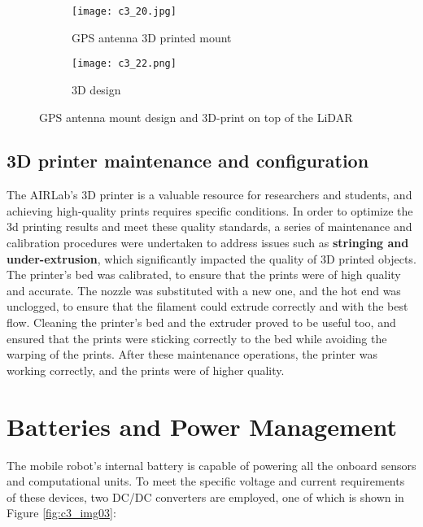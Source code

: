 \begin{figure}[t]
    \centering
    \begin{subfigure}{0.3\textwidth}
        \texttt{[image: c3\_20.jpg]}
        \captionsetup{width=0.9\linewidth}
        \caption{GPS antenna 3D printed mount}
        \label{fig:gps3d}
    \end{subfigure}
    \hfill
    \begin{subfigure}{0.67\textwidth}
        \texttt{[image: c3\_22.png]}
        \caption{3D design}
        \label{fig:gpsprint}
    \end{subfigure}
    \captionsetup{width=1\linewidth}
    \caption{GPS antenna mount design and 3D-print on top of the LiDAR}
    \label{fig:c3_gps}
\end{figure}

\subsection{3D printer maintenance and configuration}

The AIRLab's 3D printer is a valuable resource for researchers and students, and achieving high-quality prints
requires specific conditions. In order to optimize the 3d printing results and meet these quality standards,
a series of maintenance and calibration procedures were undertaken to address issues such as 
\textbf{stringing and under-extrusion}, which significantly impacted the quality of 3D printed objects.
The printer's bed was calibrated, to ensure that the prints were of high quality and accurate.
The nozzle was substituted with a new one, and the hot end was unclogged, to ensure that the filament could extrude correctly
and with the best flow. Cleaning the printer's bed and the extruder proved to be useful too, and ensured
that the prints were sticking correctly to the bed while avoiding the warping of the prints.
After these maintenance operations, the printer was working correctly, and the prints were of higher quality.

\section{Batteries and Power Management}

The mobile robot's internal battery is capable of powering all the onboard sensors and computational
units. To meet the specific voltage and current requirements of these devices, 
two DC/DC converters are employed, one of which is shown in Figure \ref{fig:c3_img03}:

